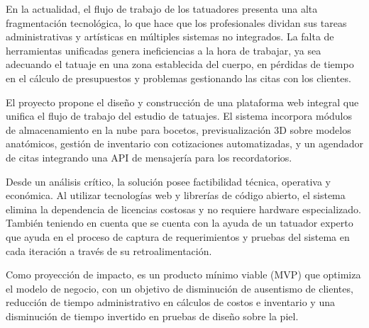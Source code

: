 \vspace{10.75pt}

En la actualidad, el flujo de trabajo de los tatuadores presenta una alta fragmentación tecnológica, lo que hace que los profesionales dividan sus tareas administrativas y artísticas en múltiples sistemas no integrados. La falta de herramientas unificadas genera ineficiencias a la hora de trabajar, ya sea adecuando el tatuaje en una zona establecida del cuerpo, en pérdidas de tiempo en el cálculo de presupuestos y problemas gestionando las citas con los clientes.

El proyecto propone el diseño y construcción de una plataforma web integral que unifica el flujo de trabajo del estudio de tatuajes. El sistema incorpora módulos de almacenamiento en la nube para bocetos, previsualización 3D sobre modelos anatómicos, gestión de inventario con cotizaciones automatizadas, y un agendador de citas integrando una API de mensajería para los recordatorios.

Desde un análisis crítico, la solución posee factibilidad técnica, operativa y económica. Al utilizar tecnologías web y librerías de código abierto, el sistema elimina la dependencia de licencias costosas y no requiere hardware especializado. También teniendo en cuenta que se cuenta con la ayuda de un tatuador experto que ayuda en el proceso de captura de requerimientos y pruebas del sistema en cada iteración a través de su retroalimentación.

Como proyección de impacto, es un producto mínimo viable (MVP) que optimiza el modelo de negocio, con un objetivo de disminución de ausentismo de clientes, reducción de tiempo administrativo en cálculos de costos e inventario y una disminución de tiempo invertido en pruebas de diseño sobre la piel.
